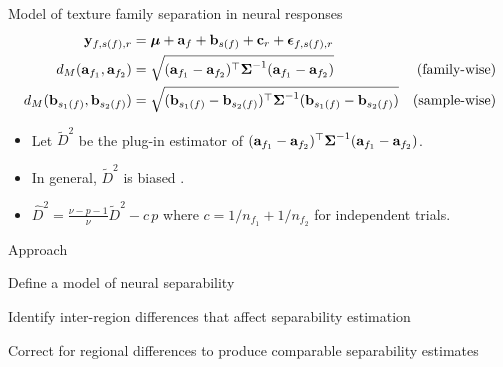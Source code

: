 \documentclass[aspectratio=169, handout]{beamer}
\newcommand{\todo}[1]{{\color{purple}#1}}
\begin{document}
\begin{frame}{Model of texture family separation in neural responses}
\begin{align*} 
\mathbf{y}_{f, s(f), r} &= \boldsymbol{ \mu } + \mathbf{a}_f + \mathbf{b}_{s(f)} + \mathbf{c}_r + \boldsymbol{ \epsilon }_{f, s(f), r}  \\
d_M (\mathbf{a}_{f_1},  \mathbf{a}_{f_2} ) 
&= \sqrt{(\mathbf{a}_{f_1} - \mathbf{a}_{f_2})^\top \boldsymbol{ \Sigma }^{-1} (\mathbf{a}_{f_1} - \mathbf{a}_{f_2})} & \textrm{(family-wise)} \\
d_M (\mathbf{b}_{s_1 (f)}, \mathbf{b}_{s_2 (f)}) &= \sqrt{(\mathbf{b}_{s_1 (f)} - \mathbf{b}_{s_2 (f)})^\top \boldsymbol{ \Sigma }^{-1} (\mathbf{b}_{s_1 (f)} - \mathbf{b}_{s_2 (f)})}  & \textrm{(sample-wise)} 
\end{align*}
\pause 
\begin{itemize}
    \item Let \( \tilde{D}^2 \) be the plug-in estimator of \( (\mathbf{a}_{f_1} - \mathbf{a}_{f_2})^\top \boldsymbol{ \Sigma }^{-1} (\mathbf{a}_{f_1} - \mathbf{a}_{f_2}) \). \pause 
    \item In general, \( \tilde{D}^2 \) is biased \parencite{sjovold_notes_1975}. \pause
    \item \( \hat{D}^2 = \frac{\nu - p - 1}{\nu} \tilde{D}^2 - c\,p \) where \( c = 1 / n_{f_1} + 1 / n_{f_2} \) for independent trials.
\end{itemize}
\end{frame}


\begin{frame}{Approach}
    \begin{enumerate}
        {\color{gray} \item Define a model of neural separability}
        \item  Identify inter-region differences that affect separability estimation 
        {\color{gray} \item  Correct for regional differences to produce comparable separability estimates}
    \end{enumerate}
\end{frame}
\end{document}
